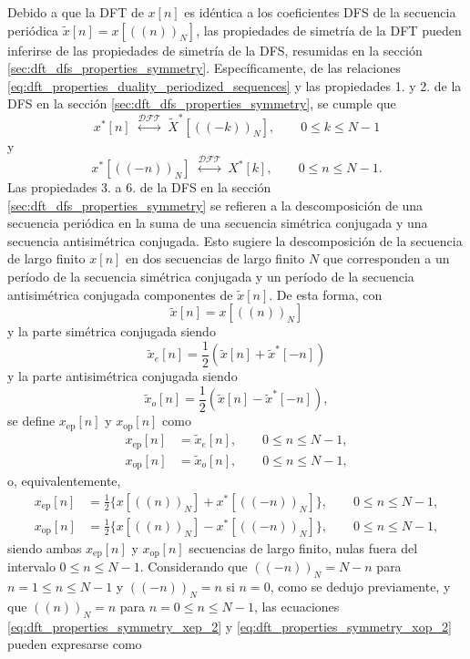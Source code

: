 \documentclass[a4paper]{report}
\begin{document}
Debido a que la DFT de \(x[n]\) es idéntica a los coeficientes DFS de la secuencia periódica \(\tilde{x}[n]=x[((n))_N]\), las propiedades de simetría de la DFT pueden inferirse de las propiedades de simetría de la DFS, resumidas en la sección \ref{sec:dft_dfs_properties_symmetry}. Específicamente, de las relaciones  \ref{eq:dft_properties_duality_periodized_sequences} y las propiedades 1. y 2. de la DFS en la sección \ref{sec:dft_dfs_properties_symmetry}, se cumple que 
\[
 x^*[n]\;\overset{\mathcal{DFT}}{\longleftrightarrow}\;\tilde{X}^*[((-k))_N],
 \qquad 0\leq k\leq N-1
\]
y
\[
 x^*[((-n))_N]\;\overset{\mathcal{DFT}}{\longleftrightarrow}\;{X}^*[k],
 \qquad 0\leq n\leq N-1.
\]
Las propiedades 3. a 6. de la DFS en la sección \ref{sec:dft_dfs_properties_symmetry} se refieren a la descomposición de una secuencia periódica en la suma de una secuencia simétrica conjugada y una secuencia antisimétrica conjugada. Esto sugiere la descomposición de la secuencia de largo finito \(x[n]\) en dos secuencias de largo finito \(N\) que corresponden a un período de la secuencia simétrica conjugada y un período de la secuencia antisimétrica conjugada componentes de \(\tilde{x}[n]\). De esta forma, con
\[
 \tilde{x}[n]=x[((n))_N]
\]
y la parte simétrica conjugada siendo
\begin{equation}\label{eq:dft_properties_symmetry_xte}
 \tilde{x}_e[n]=\frac{1}{2}(\tilde{x}[n]+\tilde{x}^*[-n]) 
\end{equation}
y la parte antisimétrica conjugada siendo
\begin{equation}\label{eq:dft_properties_symmetry_xto}
 \tilde{x}_o[n]=\frac{1}{2}(\tilde{x}[n]-\tilde{x}^*[-n]), 
\end{equation}
se define \(x_\textrm{ep}[n]\) y \(x_\textrm{op}[n]\) como
\begin{align}
 x_\textrm{ep}[n]&=\tilde{x}_e[n],\qquad 0\leq n\leq N-1,\label{eq:dft_properties_symmetry_xep_1}\\
 x_\textrm{op}[n]&=\tilde{x}_o[n],\qquad 0\leq n\leq N-1,\label{eq:dft_properties_symmetry_xop_1}
\end{align}
o, equivalentemente,
\begin{align}
 x_\textrm{ep}[n]&=\frac{1}{2}\{x[((n))_N]+x^*[((-n))_N]\},\qquad 0\leq n\leq N-1,\label{eq:dft_properties_symmetry_xep_2}\\
 x_\textrm{op}[n]&=\frac{1}{2}\{x[((n))_N]-x^*[((-n))_N]\},\qquad 0\leq n\leq N-1,\label{eq:dft_properties_symmetry_xop_2}
\end{align}
siendo ambas \(x_\textrm{ep}[n]\) y \(x_\textrm{op}[n]\) secuencias de largo finito, nulas fuera del intervalo \(0\leq n\leq N-1\). Considerando que \(((-n))_N=N-n\) para \(n=1\leq n\leq N-1\) y \(((-n))_N=n\) si \(n=0\), como se dedujo previamente, y que \(((n))_N=n\) para \(n=0\leq n\leq N-1\), las ecuaciones \ref{eq:dft_properties_symmetry_xep_2} y \ref{eq:dft_properties_symmetry_xop_2} pueden expresarse como
\end{document}
